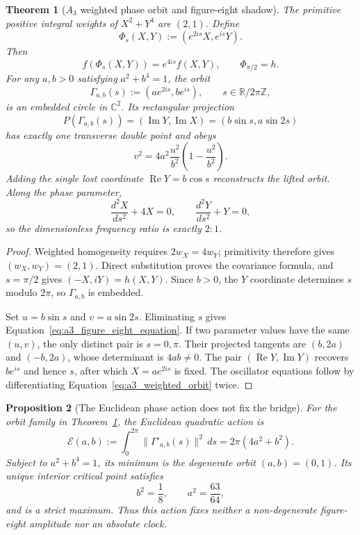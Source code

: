 \documentclass[11pt]{article}
\newtheorem{theorem}{Theorem}[section]
\newtheorem{proposition}[theorem]{Proposition}
\begin{document}
\begin{theorem}[$A_3$ weighted phase orbit and figure-eight shadow]
\label{thm:a3_weighted_figure_eight}
The primitive positive integral weights of $X^2+Y^4$ are $(2,1)$.  Define
\[
 \Phi_s(X,Y):=(e^{2is}X,e^{is}Y).
\]
Then
\[
 f(\Phi_s(X,Y))=e^{4is}f(X,Y),
 \qquad \Phi_{\pi/2}=h.
\]
For any $a,b>0$ satisfying $a^2+b^4=1$, the orbit
\[
 \Gamma_{a,b}(s):=(ae^{2is},be^{is}),
 \qquad s\in\mathbb R/2\pi\mathbb Z,
 \label{eq:a3_weighted_orbit}
\]
is an embedded circle in $\mathbb C^2$.  Its rectangular projection
\[
 P(\Gamma_{a,b}(s))=(\operatorname{Im}Y,\operatorname{Im}X)
 =(b\sin s,a\sin2s)
 \label{eq:a3_figure_eight_projection}
\]
has exactly one transverse double point and obeys
\[
 v^2=4a^2\frac{u^2}{b^2}
 \left(1-\frac{u^2}{b^2}\right).
 \label{eq:a3_figure_eight_equation}
\]
Adding the single lost coordinate $\operatorname{Re}Y=b\cos s$ reconstructs
the lifted orbit.  Along the phase parameter,
\[
 \frac{d^2X}{ds^2}+4X=0,
 \qquad
 \frac{d^2Y}{ds^2}+Y=0,
\]
so the dimensionless frequency ratio is exactly $2:1$.
\end{theorem}

\begin{proof}
Weighted homogeneity requires $2w_X=4w_Y$; primitivity therefore gives
$(w_X,w_Y)=(2,1)$.  Direct substitution proves the covariance formula, and
$s=\pi/2$ gives $(-X,iY)=h(X,Y)$.  Since $b>0$, the $Y$ coordinate determines
$s$ modulo $2\pi$, so $\Gamma_{a,b}$ is embedded.

Set $u=b\sin s$ and $v=a\sin2s$.  Eliminating $s$ gives
Equation~\eqref{eq:a3_figure_eight_equation}.  If two parameter values have
the same $(u,v)$, the only distinct pair is $s=0,\pi$.  Their projected
tangents are $(b,2a)$ and $(-b,2a)$, whose determinant is $4ab\ne0$.
The pair $(\operatorname{Re}Y,\operatorname{Im}Y)$ recovers $be^{is}$ and
hence $s$, after which $X=ae^{2is}$ is fixed.  The oscillator equations follow
by differentiating Equation~\eqref{eq:a3_weighted_orbit} twice.
\end{proof}

\begin{proposition}[The Euclidean phase action does not fix the bridge]
\label{prop:a3_amplitude_nogo}
For the orbit family in Theorem~\ref{thm:a3_weighted_figure_eight}, the
Euclidean quadratic action is
\[
 \mathcal E(a,b)
 :=\int_0^{2\pi}\|\Gamma'_{a,b}(s)\|^2\,ds
 =2\pi(4a^2+b^2).
\]
Subject to $a^2+b^4=1$, its minimum is the degenerate orbit $(a,b)=(0,1)$.
Its unique interior critical point satisfies
\[
 b^2=\frac18,
 \qquad a^2=\frac{63}{64},
\]
and is a strict maximum.  Thus this action fixes neither a non-degenerate
figure-eight amplitude nor an absolute clock.
\end{proposition}
\end{document}
